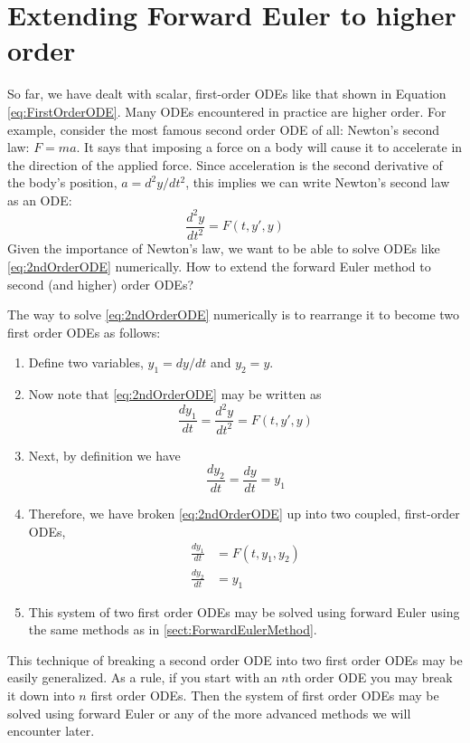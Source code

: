 \documentclass[hidelinks,notitlepage]{book}
\begin{document}
\section{Extending Forward Euler to higher order}  
\label{sect:HigherOrderForwardEuler}
So far, we have dealt with scalar, first-order ODEs like that shown in Equation \cref{eq:FirstOrderODE}.  Many ODEs encountered in practice are higher order.  For example, consider the most famous second order ODE of all: Newton's second law:  $F = ma$.  It says that imposing a force on a body will cause it to accelerate in the direction of the applied force.  Since acceleration is the second derivative of the body's position, $a = d^2 y/ d t^2$, this implies we can write Newton's second law as an ODE:
\begin{equation}
\label{eq:2ndOrderODE}
\frac{d^2 y}{d t^2} = F(t, y', y) 
\end{equation}
Given the importance of Newton's law, we want to be able to solve ODEs like \cref{eq:2ndOrderODE} numerically.  How to extend the forward Euler method to second (and higher) order ODEs?

The way to solve \cref{eq:2ndOrderODE} numerically is to rearrange it to become two first order ODEs as follows:
\begin{enumerate}
	\item Define two variables, $y_1 = dy/dt$ and $y_2 = y$.
	\item Now note that \cref{eq:2ndOrderODE} may be written as
	\begin{equation}
	\nonumber
	\frac{d y_1}{d t} = \frac{d^2 y}{d t^2} = F(t, y', y)
	\end{equation}
	\item Next, by definition we have
	\begin{equation}
	\nonumber
	\frac{d y_2}{d t} = \frac{d y}{d t} = y_1
	\end{equation}
	\item Therefore, we have broken  \cref{eq:2ndOrderODE} up into two coupled, first-order ODEs,
	\begin{align}
	\nonumber
	\frac{d y_1}{d t} &= F(t, y_1, y_2) \\
	\nonumber
	\frac{d y_2}{d t} &= y_1
	\end{align}
	\item This system of two first order ODEs may be solved using forward Euler using the same methods as in \cref{sect:ForwardEulerMethod}.
\end{enumerate}
This technique of breaking a second order ODE into two first order ODEs may be easily generalized.  As a rule, if you start with an $n$th order ODE you may break it down into $n$ first order ODEs.  Then the system of first order ODEs may be solved using forward Euler or any of the more advanced methods we will encounter later.
\end{document}
